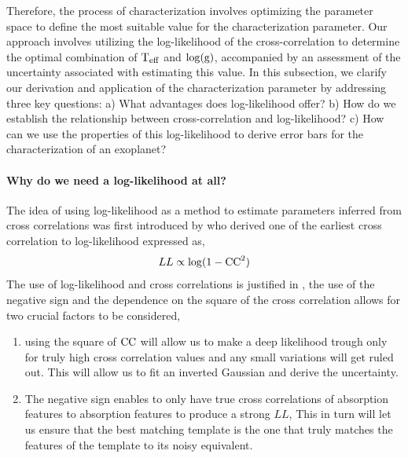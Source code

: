Therefore, the process of characterization involves optimizing the parameter space to define the most suitable value for the characterization parameter. Our approach involves utilizing the log-likelihood of the cross-correlation to determine the optimal combination of $\rm{T_{eff}}$ and $\rm{\log(g)}$, accompanied by an assessment of the uncertainty associated with estimating this value.
In this subsection, we clarify our derivation and application of the characterization parameter by addressing three key questions:
a) What advantages does log-likelihood offer?
b) How do we establish the relationship between cross-correlation and log-likelihood?
c) How can we use the properties of this log-likelihood to derive error bars for the characterization of an exoplanet?

\paragraph{Why do we need a log-likelihood at all?\\}
The idea of using log-likelihood as a method to estimate parameters inferred from cross correlations was first introduced by \cite{2003Zucker} who derived one of the earliest cross correlation to log-likelihood expressed as,
\begin{equation}
    LL \propto \log(1-\rm{CC}^2)
    \label{eq:LL-cc eqn}
\end{equation}
The use of log-likelihood and cross correlations is justified in \cite{2019Brogi}, the use of the negative sign and the dependence on the square of the cross correlation allows for two crucial factors to be considered,
\begin{enumerate}
\item using the square of $\rm{CC}$ will allow us to make a deep likelihood trough only for truly high cross correlation values and any small variations will get ruled out.
This will allow us to fit an inverted Gaussian and derive the uncertainty.
\item The negative sign enables to only have true cross correlations of absorption features to absorption features to produce a strong $LL$,
This in turn will let us ensure that the best matching template is the one that truly matches the features of the template to its noisy equivalent.
    \end{enumerate}

